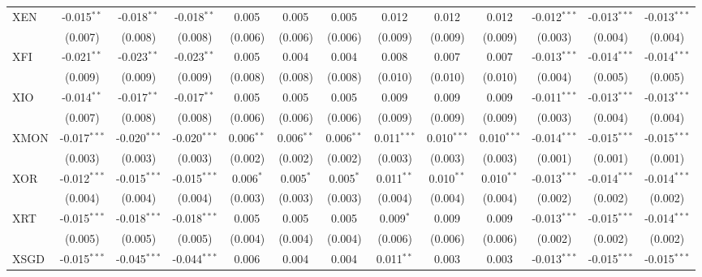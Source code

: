 \begin{table}[!htbp]
\begin{tabular}{@{\extracolsep{5pt}}lcccccccccccc}
 XEN & -0.015$^{**}$ & -0.018$^{**}$ & -0.018$^{**}$ & 0.005$^{}$ & 0.005$^{}$ & 0.005$^{}$ & 0.012$^{}$ & 0.012$^{}$ & 0.012$^{}$ & -0.012$^{***}$ & -0.013$^{***}$ & -0.013$^{***}$ \\
  & (0.007) & (0.008) & (0.008) & (0.006) & (0.006) & (0.006) & (0.009) & (0.009) & (0.009) & (0.003) & (0.004) & (0.004) \\
 XFI & -0.021$^{**}$ & -0.023$^{**}$ & -0.023$^{**}$ & 0.005$^{}$ & 0.004$^{}$ & 0.004$^{}$ & 0.008$^{}$ & 0.007$^{}$ & 0.007$^{}$ & -0.013$^{***}$ & -0.014$^{***}$ & -0.014$^{***}$ \\
  & (0.009) & (0.009) & (0.009) & (0.008) & (0.008) & (0.008) & (0.010) & (0.010) & (0.010) & (0.004) & (0.005) & (0.005) \\
 XIO & -0.014$^{**}$ & -0.017$^{**}$ & -0.017$^{**}$ & 0.005$^{}$ & 0.005$^{}$ & 0.005$^{}$ & 0.009$^{}$ & 0.009$^{}$ & 0.009$^{}$ & -0.011$^{***}$ & -0.013$^{***}$ & -0.013$^{***}$ \\
  & (0.007) & (0.008) & (0.008) & (0.006) & (0.006) & (0.006) & (0.009) & (0.009) & (0.009) & (0.003) & (0.004) & (0.004) \\
 XMON & -0.017$^{***}$ & -0.020$^{***}$ & -0.020$^{***}$ & 0.006$^{**}$ & 0.006$^{**}$ & 0.006$^{**}$ & 0.011$^{***}$ & 0.010$^{***}$ & 0.010$^{***}$ & -0.014$^{***}$ & -0.015$^{***}$ & -0.015$^{***}$ \\
  & (0.003) & (0.003) & (0.003) & (0.002) & (0.002) & (0.002) & (0.003) & (0.003) & (0.003) & (0.001) & (0.001) & (0.001) \\
 XOR & -0.012$^{***}$ & -0.015$^{***}$ & -0.015$^{***}$ & 0.006$^{*}$ & 0.005$^{*}$ & 0.005$^{*}$ & 0.011$^{**}$ & 0.010$^{**}$ & 0.010$^{**}$ & -0.013$^{***}$ & -0.014$^{***}$ & -0.014$^{***}$ \\
  & (0.004) & (0.004) & (0.004) & (0.003) & (0.003) & (0.003) & (0.004) & (0.004) & (0.004) & (0.002) & (0.002) & (0.002) \\
 XRT & -0.015$^{***}$ & -0.018$^{***}$ & -0.018$^{***}$ & 0.005$^{}$ & 0.005$^{}$ & 0.005$^{}$ & 0.009$^{*}$ & 0.009$^{}$ & 0.009$^{}$ & -0.013$^{***}$ & -0.015$^{***}$ & -0.014$^{***}$ \\
  & (0.005) & (0.005) & (0.005) & (0.004) & (0.004) & (0.004) & (0.006) & (0.006) & (0.006) & (0.002) & (0.002) & (0.002) \\
 XSGD & -0.015$^{***}$ & -0.045$^{***}$ & -0.044$^{***}$ & 0.006$^{}$ & 0.004$^{}$ & 0.004$^{}$ & 0.011$^{**}$ & 0.003$^{}$ & 0.003$^{}$ & -0.013$^{***}$ & -0.015$^{***}$ & -0.015$^{***}$ \\

\end{tabular}
\end{table}
